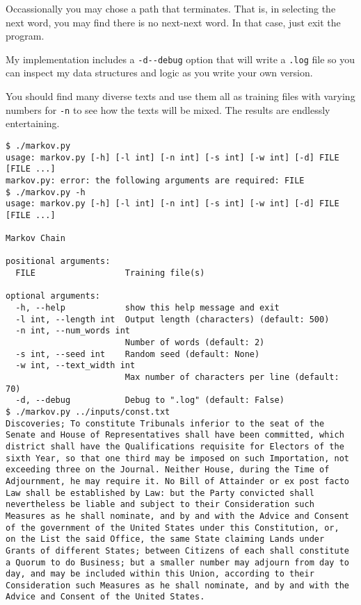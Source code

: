 \documentclass[]{article}
\begin{document}
Occassionally you may chose a path that terminates. That is, in
selecting the next word, you may find there is no next-next word. In
that case, just exit the program.

My implementation includes a \texttt{-d\textbar{}-\/-debug} option that
will write a \texttt{.log} file so you can inspect my data structures
and logic as you write your own version.

You should find many diverse texts and use them all as training files
with varying numbers for \texttt{-n} to see how the texts will be mixed.
The results are endlessly entertaining.

\begin{verbatim}
$ ./markov.py
usage: markov.py [-h] [-l int] [-n int] [-s int] [-w int] [-d] FILE [FILE ...]
markov.py: error: the following arguments are required: FILE
$ ./markov.py -h
usage: markov.py [-h] [-l int] [-n int] [-s int] [-w int] [-d] FILE [FILE ...]

Markov Chain

positional arguments:
  FILE                  Training file(s)

optional arguments:
  -h, --help            show this help message and exit
  -l int, --length int  Output length (characters) (default: 500)
  -n int, --num_words int
                        Number of words (default: 2)
  -s int, --seed int    Random seed (default: None)
  -w int, --text_width int
                        Max number of characters per line (default: 70)
  -d, --debug           Debug to ".log" (default: False)
$ ./markov.py ../inputs/const.txt
Discoveries; To constitute Tribunals inferior to the seat of the
Senate and House of Representatives shall have been committed, which
district shall have the Qualifications requisite for Electors of the
sixth Year, so that one third may be imposed on such Importation, not
exceeding three on the Journal. Neither House, during the Time of
Adjournment, he may require it. No Bill of Attainder or ex post facto
Law shall be established by Law: but the Party convicted shall
nevertheless be liable and subject to their Consideration such
Measures as he shall nominate, and by and with the Advice and Consent
of the government of the United States under this Constitution, or,
on the List the said Office, the same State claiming Lands under
Grants of different States; between Citizens of each shall constitute
a Quorum to do Business; but a smaller number may adjourn from day to
day, and may be included within this Union, according to their
Consideration such Measures as he shall nominate, and by and with the
Advice and Consent of the United States.
\end{verbatim}
\end{document}
